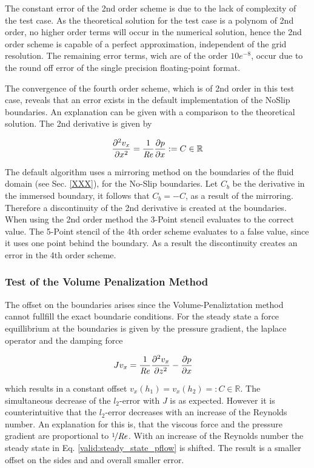 The constant error of the 2nd order scheme is due to the lack of complexity of the test case.
As the theoretical solution for the test case is a polynom of 2nd order,
no higher order terms will occur in the numerical solution, hence the
2nd order scheme is capable of a perfect approximation, independent of the
grid resolution. The remaining error terms, wich  are of the order $10e^{-8}$,
occur due to the round off error of the single precision floating-point format.

The convergence of the fourth order scheme, which is of 2nd order in this test case,
reveals that an error exists in the default implementation of the NoSlip boundaries.
An explanation can be given with a comparison to the theoretical solution.
The 2nd derivative is given by

\begin{align}
    \pdn[^2 v_x]{x^2} = \frac{1}{\Rey}\pdn[p]{x} := C\in\mathbb{R}
\end{align}

The default algorithm uses a mirroring method on the boundaries of the fluid domain (see Sec. \ref{XXX}), for the No-Slip boundaries.
Let $C_b$ be the derivative in the immersed boundary, it follows that $C_b = - C$, as a result of the mirroring.
Therefore a discontinuity of the 2nd derivative is created at the boundaries.
When using the 2nd order method the 3-Point stencil evaluates to the correct value.
The 5-Point stencil of the 4th order scheme evaluates to a false value, since it uses one point behind the boundary.
As a result the discontinuity creates an error in the 4th order scheme.

\subsubsection{Test of the Volume Penalization Method}

The offset on the boundaries arises since the Volume-Penaliztation method cannot fullfill the exact boundarie conditions.
For the steady state a force equillibrium at the boundaries is given by the pressure gradient, the laplace operator and the damping force

\begin{align}
\label{valid:steady_state_pflow}
 J v_x &=  \frac{1}{\Rey}\frac{\partial^2 v_x}{\partial z^2} -\pdn[p]{x}
\end{align}

which results in a constant offset $v_x(h_1) = v_x(h_2) =: C\in\mathbb{R}$.
The simultaneous decrease of the $l_2$-error with $J$ is as expected.
However it is counterintuitive that the $l_2$-error decreases with an increase of the Reynolds number.
An explanation for this is, that the viscous force and the pressure gradient are proportional to $\nicefrac{1}{\Rey}$.
With an increase of the Reynolds number the steady state in Eq. \ref{valid:steady_state_pflow} is shifted.
The result is a smaller offset on the sides and and overall smaller error.

